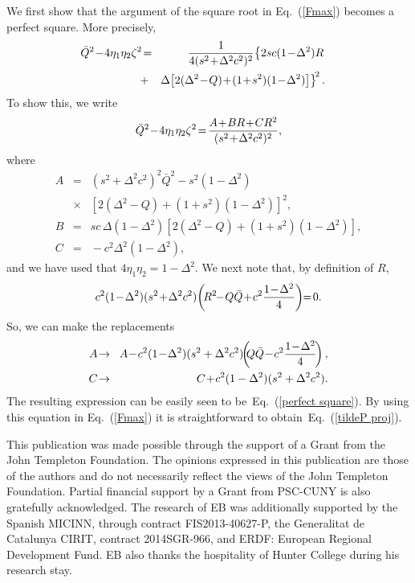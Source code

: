 \documentclass[aps,pra,twocolumn,showpacs]{revtex4-1}
\begin{document}
 We first show that the argument of the square root in Eq.~(\ref{Fmax}) becomes a perfect square. More precisely,
%
\begin{eqnarray}
\hspace{-1em}\bar Q^2\!-\!4\eta_1\eta_2\zeta^2\!&=&\!{1\over  4(s^2\!+\!\Delta^2 c^2)^2}\!\left\{
2sc(1\!-\!\Delta^2)R\right.\nonumber\\
\!&+&\!\!
\left.
\Delta\!
\left[
2(\Delta^2\!-\!Q)\!+\!(1\!+\!s^2)(1\!-\!\Delta^2)
\right]
\right\}^{\!2}.
\label{perfect square}
\end{eqnarray}
%
To show this, we write 
%
\begin{equation}
\bar Q^2\!-\!4\eta_1\eta_2\zeta^2\!=\!{A\!+\!BR\!+\!CR^2\over(s^2\!+\!\Delta^2 c^2)^2},
\end{equation}
%
where
%
\begin{eqnarray}
A\!&=&\!
(s^2\!+\!\Delta^2c^2)^2\bar Q^2\!-\!
s^2(1\!-\!\Delta^2)\nonumber\\
\!&\times&\!\!
\left[
2(\Delta^2\!-\!Q)\!+\!(1\!+\!s^2)(1\!-\!\Delta^2)
\right]^2,
\nonumber\\[.5em]
B\!&=&\!
sc\,\Delta(1\!-\!\Delta^2)\!
\left[
2(\Delta^2\!\!-\!Q)\!+\!(1\!+\!s^2)(1\!-\!\Delta^2)
\right],\nonumber
\\[.5em]
C\!&=&\!-c^2\Delta^2(1\!-\!\Delta^2),
\end{eqnarray}
%
and we have used that $4\eta_1\eta_2=1-\Delta^2$.
We next note that, by definition of $R$,
%
\begin{equation}
c^2(1\!-\!\Delta^2)(s^2\!+\!\Delta^2c^2)\!
\left(\!
R^2\!\!-\!Q\bar Q\!+\!c^2{1\!-\!\Delta^2\over4}
\right)\!
\!=\!0.
\end{equation}
%
So, we can make the replacements
%
\begin{eqnarray}
A\!&\to&\!A\!-\!c^2(1\!-\!\Delta^2)(s^2+\Delta^2c^2)\!
\!\left(\!\!
Q\bar Q\!-\!c^2{1\!-\!\Delta^2\over4}\!
\right),
\nonumber\\
C\!&\to&\!C\!+\!c^2(1-\Delta^2)(s^2+\Delta^2c^2).
\end{eqnarray}
%
The resulting expression can be easily seen to be~Eq.~(\ref{perfect square}). By using this equation in Eq.~(\ref{Fmax}) it is straightforward to obtain~Eq.~(\ref{tildeP proj}).




\begin{acknowledgments}
This publication was made possible through the support of a Grant from the John Templeton Foundation. The opinions expressed in this publication are those of the authors and do not necessarily reflect the views of the John Templeton Foundation. Partial financial support by a Grant from PSC-CUNY is also gratefully acknowledged. The research of EB was additionally supported by 
the Spanish MICINN, through contract FIS2013-40627-P, the Generalitat de
Catalunya CIRIT, contract  2014SGR-966, and ERDF: European Regional Development Fund. EB also thanks the hospitality of Hunter College during his research stay.
\end{acknowledgments}
\end{document}
